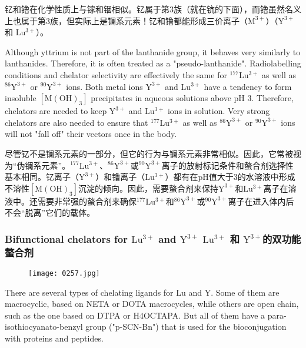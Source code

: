 \documentclass[dvipsnames, svgnames,a4paper,11pt]{article}
\begin{document}
钇和镥在化学性质上与镓和铟相似。钇属于第3族（就在钪的下面），而镥虽然名义上也属于第3族，但实际上是镧系元素！钇和镥都能形成三价离子（\(\mathrm{M^{3+}}\)）（\(\mathrm{Y^{3+}}\) 和 \(\mathrm{Lu^{3+}}\)）。


Although yttrium is not part of the lanthanide group, it behaves very similarly to lanthanides. Therefore, it is often treated as a "pseudo-lanthanide". Radiolabelling conditions and chelator selectivity are effectively the same for \(\mathrm{^{177}Lu^{3+}}\) as well as \(\mathrm{^{86}Y^{3+}}\) or \(\mathrm{^{90}Y^{3+}}\) ions. Both metal ions \(\mathrm{Y^{3+}}\) and \(\mathrm{Lu^{3+}}\) have a tendency to form insoluble \([\mathrm{M(OH)_{3}}]\) precipitates in aqueous solutions above pH 3. Therefore, chelators are needed to keep \(\mathrm{Y^{3+}}\) and \(\mathrm{Lu^{3+}}\) ions in solution. Very strong chelators are also needed to ensure that \(\mathrm{^{177}Lu^{3+}}\) as well as \(\mathrm{^{86}Y^{3+}}\) or \(\mathrm{^{90}Y^{3+}}\) ions will not "fall off" their vectors once in the body.

尽管钇不是镧系元素的一部分，但它的行为与镧系元素非常相似。因此，它常被视为“伪镧系元素”。\(\mathrm{^{177}Lu^{3+}}\)、\(\mathrm{^{86}Y^{3+}}\)或\(\mathrm{^{90}Y^{3+}}\)离子的放射标记条件和螯合剂选择性基本相同。钇离子（\(\mathrm{Y^{3+}}\)）和镥离子（\(\mathrm{Lu^{3+}}\)）都有在pH值大于3的水溶液中形成不溶性\([\mathrm{M(OH)_{3}}]\)沉淀的倾向。因此，需要螯合剂来保持\(\mathrm{Y^{3+}}\)和\(\mathrm{Lu^{3+}}\)离子在溶液中。还需要非常强的螯合剂来确保\(\mathrm{^{177}Lu^{3+}}\)和\(\mathrm{^{86}Y^{3+}}\)或\(\mathrm{^{90}Y^{3+}}\)离子在进入体内后不会“脱离”它们的载体。

\subsubsection{Bifunctional chelators for \(\mathrm{Lu^{3+}}\) and \(\mathrm{Y^{3+}}\) \(\mathrm{Lu^{3+}}\) 和 \(\mathrm{Y^{3+}}\)的双功能螯合剂}  
\begin{figure}[h]
    \centering
    \texttt{[image: 0257.jpg]}
     \label{fig346}
\end{figure}

There are several types of chelating ligands for Lu and Y. Some of them are macrocyclic, based on NETA or DOTA macrocycles, while others are open chain, such as the one based on DTPA or H4OCTAPA. But all of them have a para-isothiocyanato-benzyl group ("p-SCN-Bn") that is used for the bioconjugation with proteins and peptides.
\end{document}
